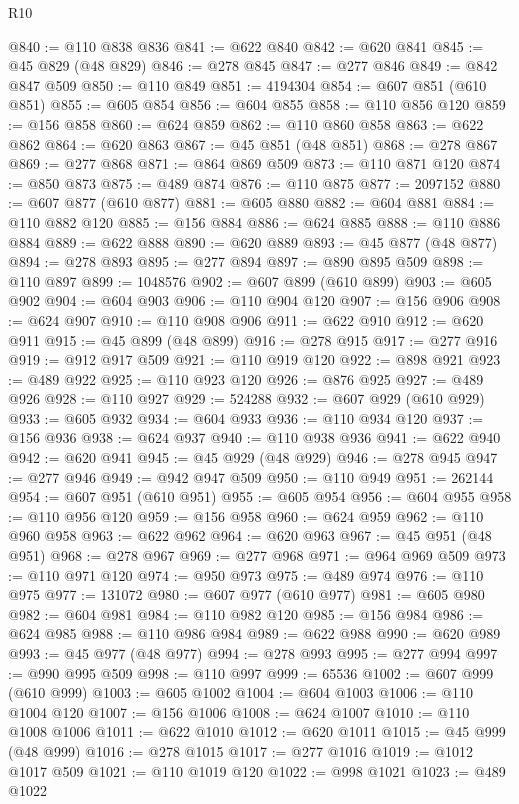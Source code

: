 \begin{lexlean}{R10}
\begin{coremodule}
{{{{{{{{{{{{{{{{{{{{{{{{{{{{{{{{{{{{{{{{{{{{{{{{{{{{{{{{{{{{{{{{{{{{{{{{{{{{{{{{{{{{@840 := @110 @838 @836
@841 := @622 @840
@842 := @620 @841
@845 := @45 @829 (@48 @829)
@846 := @278 @845
@847 := @277 @846
@849 := @842 @847 @509
@850 := @110 @849
@851 := 4194304
@854 := @607 @851 (@610 @851)
@855 := @605 @854
@856 := @604 @855
@858 := @110 @856 @120
@859 := @156 @858
@860 := @624 @859
@862 := @110 @860 @858
@863 := @622 @862
@864 := @620 @863
@867 := @45 @851 (@48 @851)
@868 := @278 @867
@869 := @277 @868
@871 := @864 @869 @509
@873 := @110 @871 @120
@874 := @850 @873
@875 := @489 @874
@876 := @110 @875
@877 := 2097152
@880 := @607 @877 (@610 @877)
@881 := @605 @880
@882 := @604 @881
@884 := @110 @882 @120
@885 := @156 @884
@886 := @624 @885
@888 := @110 @886 @884
@889 := @622 @888
@890 := @620 @889
@893 := @45 @877 (@48 @877)
@894 := @278 @893
@895 := @277 @894
@897 := @890 @895 @509
@898 := @110 @897
@899 := 1048576
@902 := @607 @899 (@610 @899)
@903 := @605 @902
@904 := @604 @903
@906 := @110 @904 @120
@907 := @156 @906
@908 := @624 @907
@910 := @110 @908 @906
@911 := @622 @910
@912 := @620 @911
@915 := @45 @899 (@48 @899)
@916 := @278 @915
@917 := @277 @916
@919 := @912 @917 @509
@921 := @110 @919 @120
@922 := @898 @921
@923 := @489 @922
@925 := @110 @923 @120
@926 := @876 @925
@927 := @489 @926
@928 := @110 @927
@929 := 524288
@932 := @607 @929 (@610 @929)
@933 := @605 @932
@934 := @604 @933
@936 := @110 @934 @120
@937 := @156 @936
@938 := @624 @937
@940 := @110 @938 @936
@941 := @622 @940
@942 := @620 @941
@945 := @45 @929 (@48 @929)
@946 := @278 @945
@947 := @277 @946
@949 := @942 @947 @509
@950 := @110 @949
@951 := 262144
@954 := @607 @951 (@610 @951)
@955 := @605 @954
@956 := @604 @955
@958 := @110 @956 @120
@959 := @156 @958
@960 := @624 @959
@962 := @110 @960 @958
@963 := @622 @962
@964 := @620 @963
@967 := @45 @951 (@48 @951)
@968 := @278 @967
@969 := @277 @968
@971 := @964 @969 @509
@973 := @110 @971 @120
@974 := @950 @973
@975 := @489 @974
@976 := @110 @975
@977 := 131072
@980 := @607 @977 (@610 @977)
@981 := @605 @980
@982 := @604 @981
@984 := @110 @982 @120
@985 := @156 @984
@986 := @624 @985
@988 := @110 @986 @984
@989 := @622 @988
@990 := @620 @989
@993 := @45 @977 (@48 @977)
@994 := @278 @993
@995 := @277 @994
@997 := @990 @995 @509
@998 := @110 @997
@999 := 65536
@1002 := @607 @999 (@610 @999)
@1003 := @605 @1002
@1004 := @604 @1003
@1006 := @110 @1004 @120
@1007 := @156 @1006
@1008 := @624 @1007
@1010 := @110 @1008 @1006
@1011 := @622 @1010
@1012 := @620 @1011
@1015 := @45 @999 (@48 @999)
@1016 := @278 @1015
@1017 := @277 @1016
@1019 := @1012 @1017 @509
@1021 := @110 @1019 @120
@1022 := @998 @1021
@1023 := @489 @1022
}}}}}}}}}}}}}}}}}}}}}}}}}}}}}}}}}}}}}}}}}}}}}}}}}}}}}}}}}}}}}}}}}}}}}}}}}}}}}}}}}}}}
\end{coremodule}
\end{lexlean}

